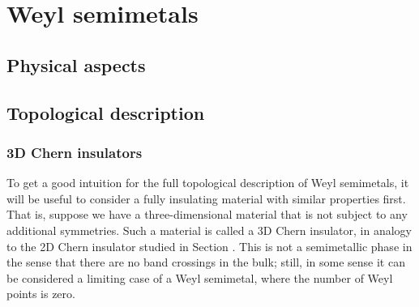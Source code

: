\chapter{Weyl semimetals}

\section{Physical aspects}


\section{Topological description}


\subsection{3D Chern insulators}

To get a good intuition for the full topological description of Weyl semimetals, it will be useful to consider a fully insulating material with similar properties first. That is, suppose we have a three-dimensional material that is not subject to any additional symmetries. Such a material is called a 3D Chern insulator, in analogy to the 2D Chern insulator studied in Section \red{[reference]}.%
This is not a semimetallic phase in the sense that there are no band crossings in the bulk; still, in some sense it can be considered a limiting case of a Weyl semimetal, where the number of Weyl points is zero.

